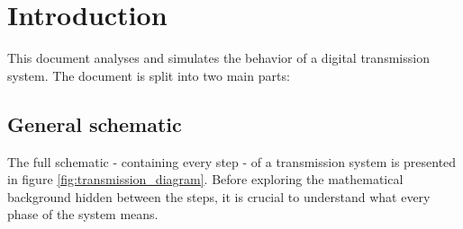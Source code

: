 \setcounter{secnumdepth}{0}
\section{Introduction}
This document analyses and simulates the behavior of a digital transmission system. The document is split into two main parts:

\subsection{General schematic}
The full schematic - containing every step - of a transmission system is presented in figure \ref{fig:transmission_diagram}. Before exploring the mathematical background hidden between the steps, it is crucial to understand what every phase of the system means.

